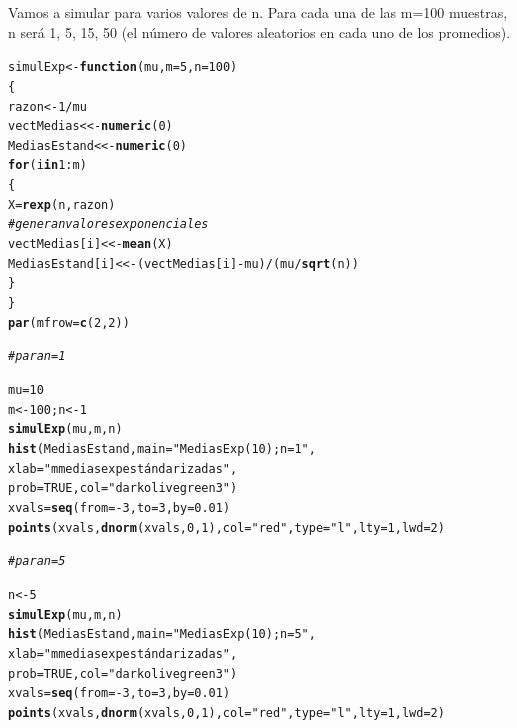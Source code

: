 \documentclass[12pt,letterpaper]{article}\usepackage[]{graphicx}\usepackage[]{color}
\makeatletter
\newcommand{\hlnum}[1]{\textcolor[rgb]{0.686,0.059,0.569}{#1}}%
\newcommand{\hlstr}[1]{\textcolor[rgb]{0.192,0.494,0.8}{#1}}%
\newcommand{\hlcom}[1]{\textcolor[rgb]{0.678,0.584,0.686}{\textit{#1}}}%
\newcommand{\hlopt}[1]{\textcolor[rgb]{0,0,0}{#1}}%
\newcommand{\hlstd}[1]{\textcolor[rgb]{0.345,0.345,0.345}{#1}}%
\newcommand{\hlkwa}[1]{\textcolor[rgb]{0.161,0.373,0.58}{\textbf{#1}}}%
\newcommand{\hlkwb}[1]{\textcolor[rgb]{0.69,0.353,0.396}{#1}}%
\newcommand{\hlkwc}[1]{\textcolor[rgb]{0.333,0.667,0.333}{#1}}%
\newcommand{\hlkwd}[1]{\textcolor[rgb]{0.737,0.353,0.396}{\textbf{#1}}}%
\newenvironment{kframe}{%
 \def\at@end@of@kframe{}%
 \ifinner\ifhmode%
  \def\at@end@of@kframe{\end{minipage}}%
  \begin{minipage}{\columnwidth}%
 \fi\fi%
 \def\FrameCommand##1{\hskip\@totalleftmargin \hskip-\fboxsep
 \colorbox{shadecolor}{##1}\hskip-\fboxsep
     \hskip-\linewidth \hskip-\@totalleftmargin \hskip\columnwidth}%
 \MakeFramed {\advance\hsize-\width
   \@totalleftmargin\z@ \linewidth\hsize
   \@setminipage}}%
 {\par\unskip\endMakeFramed%
 \at@end@of@kframe}
\newenvironment{knitrout}{}{} %
\makeatother
\begin{document}
\begin{enumerate}
Vamos a simular para varios valores de n. Para cada una de las m=100 muestras, n ser\'a 1, 5, 15, 50 (el n\'umero de valores aleatorios en cada uno de los promedios).
\begin{knitrout}
\color{fgcolor}\begin{kframe}
\begin{alltt}
\hlstd{simulExp} \hlkwb{<-} \hlkwa{function}\hlstd{(}\hlkwc{mu}\hlstd{,} \hlkwc{m}\hlstd{=}\hlnum{5}\hlstd{,} \hlkwc{n}\hlstd{=}\hlnum{100}\hlstd{)}
\hlstd{\{}
\hlstd{razon} \hlkwb{<-} \hlnum{1}\hlopt{/}\hlstd{mu}
\hlstd{vectMedias} \hlkwb{<<-} \hlkwd{numeric}\hlstd{(}\hlnum{0}\hlstd{)}
\hlstd{MediasEstand} \hlkwb{<<-} \hlkwd{numeric}\hlstd{(}\hlnum{0}\hlstd{)}
\hlkwa{for} \hlstd{(i} \hlkwa{in} \hlnum{1}\hlopt{:}\hlstd{m)}
\hlstd{\{}
\hlstd{X} \hlkwb{=} \hlkwd{rexp}\hlstd{(n, razon)}
\hlcom{# genera n valores exponenciales }
\hlstd{vectMedias[i]} \hlkwb{<<-} \hlkwd{mean}\hlstd{(X)}
\hlstd{MediasEstand[i]} \hlkwb{<<-} \hlstd{(vectMedias[i]} \hlopt{-} \hlstd{mu)}\hlopt{/}\hlstd{(mu}\hlopt{/}\hlkwd{sqrt}\hlstd{(n))}
 \hlstd{\}}
\hlstd{\}}
\hlkwd{par}\hlstd{(}\hlkwc{mfrow}\hlstd{=}\hlkwd{c}\hlstd{(}\hlnum{2}\hlstd{,}\hlnum{2}\hlstd{))}

\hlcom{# para n=1 }

\hlstd{mu}\hlkwb{=}\hlnum{10}
\hlstd{m} \hlkwb{<-} \hlnum{100}\hlstd{; n} \hlkwb{<-} \hlnum{1}
\hlkwd{simulExp}\hlstd{(mu, m, n)}
\hlkwd{hist}\hlstd{(MediasEstand,} \hlkwc{main}\hlstd{=}\hlstr{"Medias Exp(10); n=1"}\hlstd{,}
     \hlkwc{xlab}\hlstd{=}\hlstr{"m medias exp estándarizadas"}\hlstd{,}
\hlkwc{prob}\hlstd{=}\hlnum{TRUE}\hlstd{,} \hlkwc{col}\hlstd{=}\hlstr{"darkolivegreen3"}\hlstd{)}
\hlstd{xvals} \hlkwb{=} \hlkwd{seq}\hlstd{(}\hlkwc{from}\hlstd{=}\hlopt{-}\hlnum{3}\hlstd{,} \hlkwc{to}\hlstd{=}\hlnum{3}\hlstd{,} \hlkwc{by}\hlstd{=}\hlnum{0.01}\hlstd{)}
\hlkwd{points}\hlstd{(xvals,} \hlkwd{dnorm}\hlstd{(xvals,} \hlnum{0}\hlstd{,} \hlnum{1}\hlstd{),} \hlkwc{col} \hlstd{=} \hlstr{"red"}\hlstd{,} \hlkwc{type}\hlstd{=}\hlstr{"l"}\hlstd{,} \hlkwc{lty}\hlstd{=}\hlnum{1}\hlstd{,} \hlkwc{lwd}\hlstd{=}\hlnum{2}\hlstd{)}

\hlcom{# para n=5}

\hlstd{n} \hlkwb{<-} \hlnum{5}
\hlkwd{simulExp}\hlstd{(mu, m, n)}
\hlkwd{hist}\hlstd{(MediasEstand,} \hlkwc{main}\hlstd{=}\hlstr{"Medias Exp(10); n=5"}\hlstd{,}
     \hlkwc{xlab}\hlstd{=}\hlstr{"m medias exp estándarizadas"}\hlstd{,}
\hlkwc{prob}\hlstd{=}\hlnum{TRUE}\hlstd{,} \hlkwc{col}\hlstd{=}\hlstr{"darkolivegreen3"}\hlstd{)}
\hlstd{xvals} \hlkwb{=} \hlkwd{seq}\hlstd{(}\hlkwc{from}\hlstd{=}\hlopt{-}\hlnum{3}\hlstd{,} \hlkwc{to}\hlstd{=}\hlnum{3}\hlstd{,} \hlkwc{by}\hlstd{=}\hlnum{0.01}\hlstd{)}
\hlkwd{points}\hlstd{(xvals,} \hlkwd{dnorm}\hlstd{(xvals,} \hlnum{0}\hlstd{,} \hlnum{1}\hlstd{),} \hlkwc{col} \hlstd{=} \hlstr{"red"}\hlstd{,} \hlkwc{type}\hlstd{=}\hlstr{"l"}\hlstd{,} \hlkwc{lty}\hlstd{=}\hlnum{1}\hlstd{,} \hlkwc{lwd}\hlstd{=}\hlnum{2}\hlstd{)}


\end{alltt}
\end{kframe}
\end{knitrout}
\end{enumerate}
\end{document}
